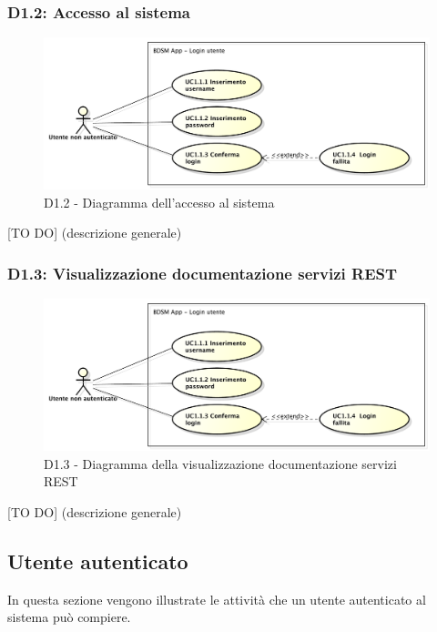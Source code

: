 		\subsubsection{D1.2: Accesso al sistema} %
		\label{ssub:accesso_al_sistema}
		\begin{figure}[!htbp]
			\centering
			\centerline{\includegraphics[scale=0.45]{./images/UC1_1.pdf}}
			\caption{D1.2 - Diagramma dell'accesso al sistema}
		\end{figure}
		[TO DO] (descrizione generale)

		\subsubsection{D1.3: Visualizzazione documentazione servizi REST} %
		\label{ssub:visualizzazione_documentazione_servizi_rest}
		\begin{figure}[!htbp]
			\centering
			\centerline{\includegraphics[scale=0.45]{./images/UC1_1.pdf}}
			\caption{D1.3 - Diagramma della visualizzazione documentazione servizi REST}
		\end{figure}
		[TO DO] (descrizione generale)


	\pagebreak

	\subsection{Utente autenticato} %
	\label{sub:utente_autenticato}
	In questa sezione vengono illustrate le attività che un utente autenticato al sistema può compiere.
